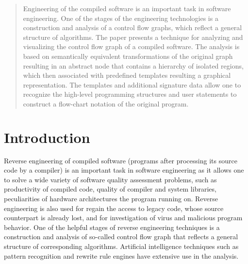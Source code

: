 \documentclass[conference]{IEEEtran}
\begin{document}




\maketitle

\begin{abstract}
Engineering of the compiled software is an important task in software engineering.  One of the stages of the engineering technologies is a construction and analysis of a control flow graphs, which reflect a general structure of algorithms.  The paper presents a technique for analyzing and visualizing the control flow graph of a compiled software.  The analysis is based on semantically equivalent transformations of the original graph resulting in an abstract node that contains a hierarchy of isolated regions, which then associated with predefined templates resulting a graphical representation.  The templates and additional signature data allow one to recognize the high-level programming structures and user statements to construct a flow-chart notation of the original program.

\end{abstract}


%
\IEEEpeerreviewmaketitle

\section{Introduction}

Reverse engineering of compiled software (programs after processing its source code by a compiler) is an important task in software engineering as it allows one to solve a wide variety of software quality assessment problems, such as productivity of compiled code, quality of compiler and system libraries, peculiarities of hardware architectures the program running on.  Reverse engineering is also used for regain the access to legacy code, whose source counterpart is already lost, and for investigation of virus and malicious program behavior.  One of the helpful stages of reverse engineering techniques is a construction and analysis of so-called control flow graph that reflects a general structure of corresponding algorithms.  Artificial intelligence techniques such as pattern recognition and rewrite rule engines have extensive use in the analysis.
\end{document}
